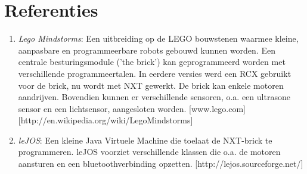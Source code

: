 \documentclass[tt3]{penoverslag}
\begin{document}
\section*{Referenties}
\begin{enumerate}

\item \textit{Lego Mindstorms}:  Een uitbreiding op de LEGO bouwstenen waarmee kleine, aanpasbare en programmeerbare robots gebouwd kunnen worden. Een centrale besturingsmodule ('the brick') kan geprogrammeerd worden met verschillende programmeertalen. In eerdere versies werd een RCX gebruikt voor de brick, nu wordt met NXT gewerkt. De brick kan enkele motoren aandrijven. Bovendien kunnen er verschillende sensoren, o.a. een ultrasone sensor en een lichtsensor, aangesloten worden.  \mbox{[www.lego.com]} \mbox{[http://en.wikipedia.org/wiki/Lego\textendash Mindstorms]}

\item \textit{leJOS}:  Een kleine Java Virtuele Machine die toelaat de NXT-brick te programmeren. leJOS voorziet verschillende klassen die o.a. de motoren aansturen en een bluetoothverbinding opzetten.  \mbox{[http://lejos.sourceforge.net/]}

\end{enumerate}
\end{document}
